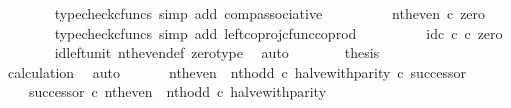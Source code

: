 \begin{isabellebody}
\ \ \ \ \ \ \isamarkupfalse%
\ {\isacharparenleft}{\kern0pt}typecheck{\isacharunderscore}{\kern0pt}cfuncs{\isacharcomma}{\kern0pt}\ simp\ add{\isacharcolon}{\kern0pt}\ comp{\isacharunderscore}{\kern0pt}associative{}{\isacharparenright}{\kern0pt}\isanewline
\ \ \ \ \isamarkupfalse%
\ \isamarkupfalse%
\ {\isachardoublequoteopen}{\isachardot}{\kern0pt}{\isachardot}{\kern0pt}{\isachardot}{\kern0pt}\ {\isacharequal}{\kern0pt}\ nth{\isacharunderscore}{\kern0pt}even\ {\isasymcirc}\isactrlsub c\ zero{\isachardoublequoteclose}\isanewline
\ \ \ \ \ \ \isamarkupfalse%
\ {\isacharparenleft}{\kern0pt}typecheck{\isacharunderscore}{\kern0pt}cfuncs{\isacharcomma}{\kern0pt}\ simp\ add{\isacharcolon}{\kern0pt}\ left{\isacharunderscore}{\kern0pt}coproj{\isacharunderscore}{\kern0pt}cfunc{\isacharunderscore}{\kern0pt}coprod{\isacharparenright}{\kern0pt}\isanewline
\ \ \ \ \isamarkupfalse%
\ \isamarkupfalse%
\ {\isachardoublequoteopen}{\isachardot}{\kern0pt}{\isachardot}{\kern0pt}{\isachardot}{\kern0pt}\ {\isacharequal}{\kern0pt}\ id\isactrlsub c\ {\isasymnat}\isactrlsub c\ {\isasymcirc}\isactrlsub c\ zero{\isachardoublequoteclose}\isanewline
\ \ \ \ \ \ \isamarkupfalse%
\ id{\isacharunderscore}{\kern0pt}left{\isacharunderscore}{\kern0pt}unit{}\ nth{\isacharunderscore}{\kern0pt}even{\isacharunderscore}{\kern0pt}def{}\ zero{\isacharunderscore}{\kern0pt}type\ \isamarkupfalse%
\ auto\isanewline
\ \ \ \ \isamarkupfalse%
\ \isamarkupfalse%
\ {\isacharquery}{\kern0pt}thesis\isanewline
\ \ \ \ \ \ \isamarkupfalse%
\ calculation\ \isamarkupfalse%
\ auto\isanewline
\ \ \isamarkupfalse%
\isanewline
\isanewline
\ \ \isamarkupfalse%
\ {\isachardoublequoteopen}{\isacharparenleft}{\kern0pt}nth{\isacharunderscore}{\kern0pt}even\ {\isasymamalg}\ nth{\isacharunderscore}{\kern0pt}odd\ {\isasymcirc}\isactrlsub c\ halve{\isacharunderscore}{\kern0pt}with{\isacharunderscore}{\kern0pt}parity{\isacharparenright}{\kern0pt}\ {\isasymcirc}\isactrlsub c\ successor\ {\isacharequal}{\kern0pt}\isanewline
\ \ \ \ successor\ {\isasymcirc}\isactrlsub c\ nth{\isacharunderscore}{\kern0pt}even\ {\isasymamalg}\ nth{\isacharunderscore}{\kern0pt}odd\ {\isasymcirc}\isactrlsub c\ halve{\isacharunderscore}{\kern0pt}with{\isacharunderscore}{\kern0pt}parity{\isachardoublequoteclose}\isanewline
\ \ \isamarkupfalse%
\ {\isacharminus}{\kern0pt}\isanewline

\end{isabellebody}
